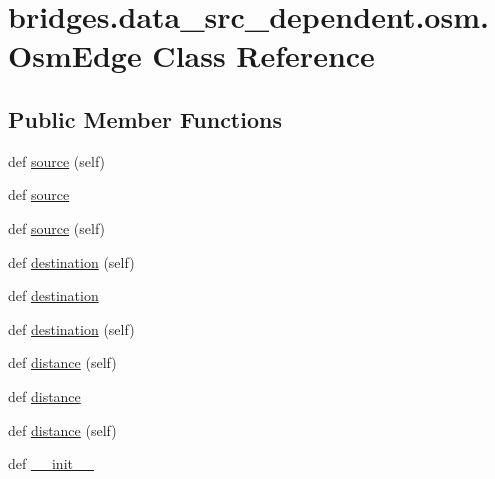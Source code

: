 \hypertarget{classbridges_1_1data__src__dependent_1_1osm_1_1_osm_edge}{}\section{bridges.\+data\+\_\+src\+\_\+dependent.\+osm.\+Osm\+Edge Class Reference}
\label{classbridges_1_1data__src__dependent_1_1osm_1_1_osm_edge}
\subsection*{Public Member Functions}
\begin{DoxyCompactItemize}
\item 
def \mbox{\hyperlink{classbridges_1_1data__src__dependent_1_1osm_1_1_osm_edge_a52c735a9496d74764fbcf29805d4f372}{source}} (self)
\item 
def \mbox{\hyperlink{classbridges_1_1data__src__dependent_1_1osm_1_1_osm_edge_a7e91ba375c45e21b3364f84d3415384d}{source}}
\item 
def \mbox{\hyperlink{classbridges_1_1data__src__dependent_1_1osm_1_1_osm_edge_a52c735a9496d74764fbcf29805d4f372}{source}} (self)
\item 
def \mbox{\hyperlink{classbridges_1_1data__src__dependent_1_1osm_1_1_osm_edge_ac3e5f99dd826c60fba46a5db69ee4b12}{destination}} (self)
\item 
def \mbox{\hyperlink{classbridges_1_1data__src__dependent_1_1osm_1_1_osm_edge_a985f37861dec03b102c0230259a27e50}{destination}}
\item 
def \mbox{\hyperlink{classbridges_1_1data__src__dependent_1_1osm_1_1_osm_edge_ac3e5f99dd826c60fba46a5db69ee4b12}{destination}} (self)
\item 
def \mbox{\hyperlink{classbridges_1_1data__src__dependent_1_1osm_1_1_osm_edge_ae20fb44608780d4f10f55c1a85e4d410}{distance}} (self)
\item 
def \mbox{\hyperlink{classbridges_1_1data__src__dependent_1_1osm_1_1_osm_edge_aa3931845de062f70bae375a389a9262d}{distance}}
\item 
def \mbox{\hyperlink{classbridges_1_1data__src__dependent_1_1osm_1_1_osm_edge_ae20fb44608780d4f10f55c1a85e4d410}{distance}} (self)
\item 
def \mbox{\hyperlink{classbridges_1_1data__src__dependent_1_1osm_1_1_osm_edge_ac0f57be58220744c49bffc353d73db6f}{\+\_\+\+\_\+init\+\_\+\+\_\+}}
\end{DoxyCompactItemize}
